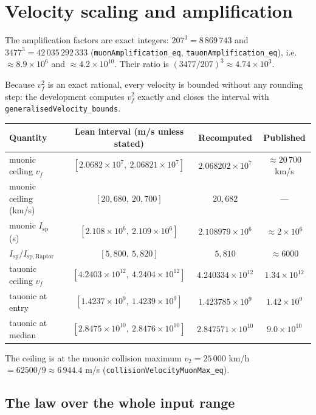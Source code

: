 \documentclass[11pt,a4paper]{article}
\begin{document}
\section{Velocity scaling and amplification}
\label{sec:velocity}

The amplification factors are exact integers:
$207^3 = 8\,869\,743$ and $3477^3 = 42\,035\,292\,333$
(\texttt{muonAmplification\_eq}, \texttt{tauonAmplification\_eq}), i.e.\
$\approx 8.9\times10^{6}$ and $\approx 4.2\times10^{10}$.  Their ratio is
$(3477/207)^3 \approx 4.74\times10^{3}$.

Because $v_f^2$ is an exact rational, every velocity is bounded without any
rounding step: the development computes $v_f^2$ exactly and closes the interval
with \texttt{generalisedVelocity\_bounds}.

\begin{center}\small
\begin{tabular}{@{}lccc@{}}
\toprule
Quantity & Lean interval (m/s unless stated) & Recomputed & Published \\
\midrule
muonic ceiling $v_f$ & $[2.0682 \times 10^{7},\ 2.06821 \times 10^{7}]$ & $2.068202 \times 10^{7}$ & $\approx 20\,700$ km/s \\
muonic ceiling (km/s) & $[20{,}680,\ 20{,}700]$ & $20{,}682$ & --- \\
muonic $I_{\mathrm{sp}}$ (s) & $[2.108 \times 10^{6},\ 2.109 \times 10^{6}]$ & $2.108979 \times 10^{6}$ & $\approx 2\times10^{6}$ \\
$I_{\mathrm{sp}}/I_{\mathrm{sp,Raptor}}$ & $[5{,}800,\ 5{,}820]$ & $5{,}810$ & $\approx 6000$ \\
tauonic ceiling $v_f$ & $[4.2403 \times 10^{12},\ 4.2404 \times 10^{12}]$ & $4.240334 \times 10^{12}$ & $1.34\times10^{12}$ \\
tauonic at entry & $[1.4237 \times 10^{9},\ 1.4239 \times 10^{9}]$ & $1.423785 \times 10^{9}$ & $1.42\times10^{9}$ \\
tauonic at median & $[2.8475 \times 10^{10},\ 2.8476 \times 10^{10}]$ & $2.847571 \times 10^{10}$ & $9.0\times10^{10}$ \\
\bottomrule
\end{tabular}
\end{center}

\noindent The ceiling is at the muonic collision maximum $v_2 = 25\,000$ km/h
$= 62500/9 \approx 6\,944.4$ m/s (\texttt{collisionVelocityMuonMax\_eq}).

\subsection*{The law over the whole input range}
\end{document}
